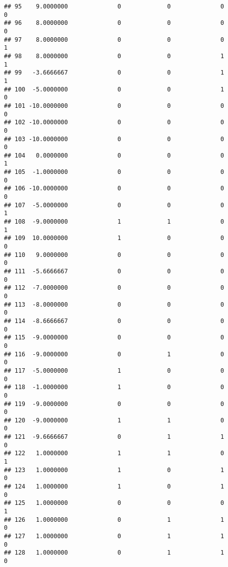 \documentclass[
]{article}
\begin{document}
\begin{verbatim}
## 95    9.0000000              0             0              0             0
## 96    8.0000000              0             0              0             0
## 97    8.0000000              0             0              0             1
## 98    8.0000000              0             0              1             1
## 99   -3.6666667              0             0              1             1
## 100  -5.0000000              0             0              1             0
## 101 -10.0000000              0             0              0             0
## 102 -10.0000000              0             0              0             0
## 103 -10.0000000              0             0              0             0
## 104   0.0000000              0             0              0             1
## 105  -1.0000000              0             0              0             0
## 106 -10.0000000              0             0              0             0
## 107  -5.0000000              0             0              0             1
## 108  -9.0000000              1             1              0             1
## 109  10.0000000              1             0              0             0
## 110   9.0000000              0             0              0             0
## 111  -5.6666667              0             0              0             0
## 112  -7.0000000              0             0              0             0
## 113  -8.0000000              0             0              0             0
## 114  -8.6666667              0             0              0             0
## 115  -9.0000000              0             0              0             0
## 116  -9.0000000              0             1              0             0
## 117  -5.0000000              1             0              0             0
## 118  -1.0000000              1             0              0             0
## 119  -9.0000000              0             0              0             0
## 120  -9.0000000              1             1              0             0
## 121  -9.6666667              0             1              1             0
## 122   1.0000000              1             1              0             1
## 123   1.0000000              1             0              1             0
## 124   1.0000000              1             0              1             0
## 125   1.0000000              0             0              0             1
## 126   1.0000000              0             1              1             0
## 127   1.0000000              0             1              1             0
## 128   1.0000000              0             1              1             0

\end{verbatim}
\end{document}
